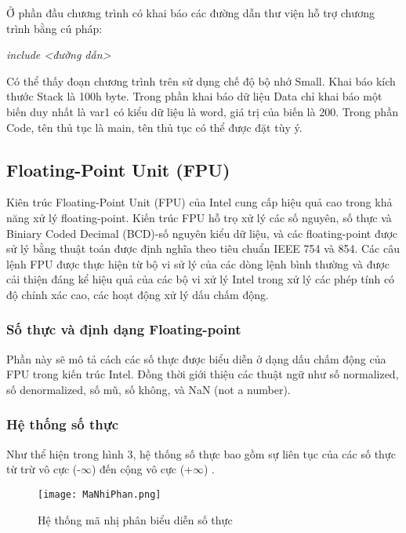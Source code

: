 		Ở phần đầu chương trình có khai báo các đường dẫn thư viện hỗ trợ chương trình bằng cú pháp:
		\begin{center}
			\textit { include <đường dẫn>} \\
		\end{center}
					
	Có thể thấy đoạn chương trình trên sử dụng chế độ bộ nhớ Small. Khai báo kích thước Stack là 100h byte. Trong phần khai báo dữ liệu Data chỉ khai báo một biến duy nhất là var1 có kiểu dữ liệu là word, giá trị của biến là 200. Trong phần Code, tên thủ tục là main, tên thủ tục có thể được đặt tùy ý.\\


	\subsection{Floating-Point Unit (FPU)}
	Kiên trúc Floating-Point Unit (FPU) của Intel cung cấp hiệu quả cao trong khả năng xử lý floating-point. Kiến trúc FPU hỗ trọ xử lý các số nguyên, số thực và Biniary Coded Decimal (BCD)-số nguyên kiểu dữ liệu, và các floating-point được sử lý bằng thuật toán được định nghĩa theo tiêu chuẩn IEEE 754 và 854. Các câu lệnh FPU được thực hiện từ bộ vi sử lý của các dòng lệnh bình thường và được cải thiện đáng kể hiệu quả của các bộ vi xử lý Intel trong xử lý các phép tính có độ chính xác cao, các hoạt động xử lý dấu chấm động.\\
		\subsubsection{Số thực và định dạng Floating-point}	
		Phần này sẽ mô tả cách các số thực được biểu diễn ở dạng dấu chấm động của FPU trong kiến trúc Intel. Đồng thời giới thiệu các thuật ngữ như số normalized, số denormalized, số mũ, số không, và NaN (not a number). 
		
		\subsubsection*{Hệ thống số thực}
		Như thể hiện trong hình 3, hệ thống số thực bao gồm sự liên tục của các số thực từ trừ vô cực (-$\mathbb{\infty}$)  đến cộng vô cực (+$\mathbb{\infty}$) .\\
		\begin{center}
			\begin{figure}[htp]
				\begin{center}
					\texttt{[image: MaNhiPhan.png]}
				\end{center}
				\caption{Hệ thống mã nhị phân biểu diễn số thực}				
			\end{figure}
		\end{center}		
		

